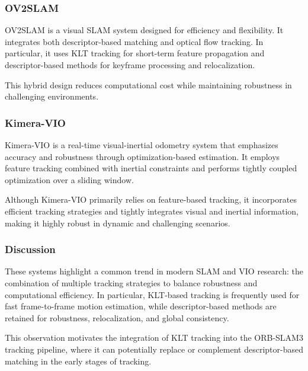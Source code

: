 \documentclass[english, cd=nocolor, cdfont=off, fontsize=11pt]{tudscrreprt}
\begin{document}
\subsubsection{OV2SLAM}

OV2SLAM is a visual SLAM system designed for efficiency and flexibility. It integrates both descriptor-based matching and optical flow tracking. In particular, it uses KLT tracking for short-term feature propagation and descriptor-based methods for keyframe processing and relocalization.

This hybrid design reduces computational cost while maintaining robustness in challenging environments.

\subsubsection{Kimera-VIO}

Kimera-VIO is a real-time visual-inertial odometry system that emphasizes accuracy and robustness through optimization-based estimation. It employs feature tracking combined with inertial constraints and performs tightly coupled optimization over a sliding window.

Although Kimera-VIO primarily relies on feature-based tracking, it incorporates efficient tracking strategies and tightly integrates visual and inertial information, making it highly robust in dynamic and challenging scenarios.

\subsubsection{Discussion}

These systems highlight a common trend in modern SLAM and VIO research: the combination of multiple tracking strategies to balance robustness and computational efficiency. In particular, KLT-based tracking is frequently used for fast frame-to-frame motion estimation, while descriptor-based methods are retained for robustness, relocalization, and global consistency.

This observation motivates the integration of KLT tracking into the ORB-SLAM3 tracking pipeline, where it can potentially replace or complement descriptor-based matching in the early stages of tracking.
\end{document}
